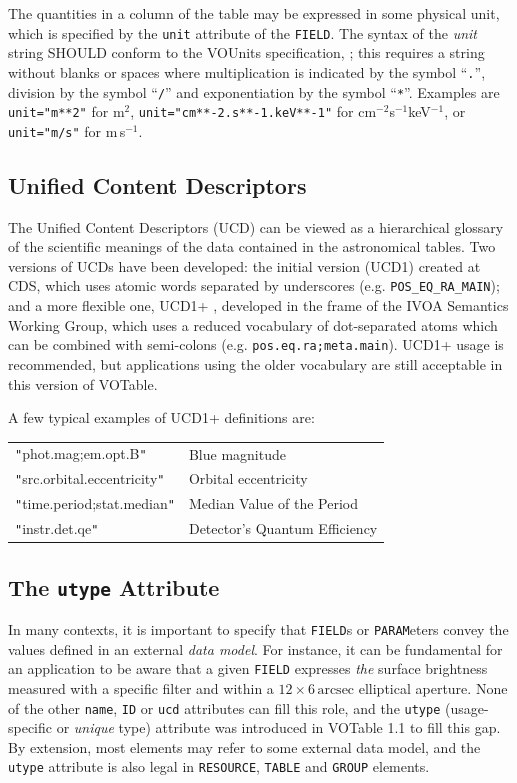 \documentclass[11pt,a4paper]{ivoa}
\let\fg=\color
\def\attr#1{{\tt{\fg{DarkRed}#1}}}
\def\elem#1{{\tt{\fg{DarkRed}#1}}}
\def\attrval#1#2{{\tt{\fg{DarkRed}#1}="{\fg{DarkPurple}#2}"}}
\def\literalvalue#1{{\tt"}{{\fg{DarkPurple}#1}}{\tt"}}
\begin{document}
The quantities in a column of the table may be expressed in
some physical unit,
which is specified by the {\attr{unit}}
attribute of the {\elem{FIELD}}.
The syntax of the {\em unit} string SHOULD conform to
the VOUnits specification, \citet{2023ivoa.spec.1215G};
this requires a string without blanks or spaces
where multiplication is indicated by the symbol ``{\tt.}'',
division by the symbol ``{\tt/}''
and exponentiation by the symbol ``{\tt**}''.
Examples are \attrval{unit}{m**2} for m$^2$,
\attrval{unit}{cm**-2.s**-1.keV**-1} for cm$^{-2}$s$^{-1}$keV$^{-1}$,
or \attrval{unit}{m/s} for m\,s$^{-1}$.

\subsection{Unified Content Descriptors}
\label{sec:ucd}

The Unified Content Descriptors (UCD) can be viewed as a
hierarchical glossary of the scientific meanings of the data
contained in the astronomical tables.
Two versions of UCDs have been developed:
the initial version (UCD1) created at CDS, which uses
atomic words separated by underscores (e.g. {\tt POS\_EQ\_RA\_MAIN});
and a more flexible one, UCD1+ \citep{2023ivoa.spec.0125C},
developed in the frame of the IVOA Semantics Working Group, which uses
a reduced vocabulary of dot-separated atoms which can be
combined with semi-colons (e.g. {\tt pos.eq.ra;meta.main}).
UCD1+ usage is recommended, but applications using the older
vocabulary are still acceptable in this version of VOTable.

\noindent A few typical examples of UCD1+ definitions
 are:

\begin{tabular}{ll}
{\literalvalue{phot.mag;em.opt.B}}        &  Blue magnitude \\
{\literalvalue{src.orbital.eccentricity}} &  Orbital eccentricity \\
{\literalvalue{time.period;stat.median}}  &  Median Value of the Period \\
{\literalvalue{instr.det.qe}}             &  Detector's Quantum Efficiency \\
\end{tabular}


\subsection{The \attr{utype} Attribute}
\label{sec:utype}
In many contexts, it is important to specify that \elem{FIELD}s or
\elem{PARAM}eters convey the values defined in an external {\em data
model}. For instance, it can be fundamental for an application to
be aware that a given \elem{FIELD} expresses \emph{the} surface brightness
measured with a specific filter and within a
$12\times6\,\textrm{arcsec}$ elliptical aperture.
None of the other \attr{name}, \attr{ID}
or \attr{ucd} attributes can fill this role, and
the \attr{utype} (usage-specific or {\em unique} type) attribute was
introduced in VOTable 1.1 to fill this gap.
By extension, most elements may refer to some external data model,
and the \attr{utype} attribute is also legal in \elem{RESOURCE},
\elem{TABLE} and \elem{GROUP} elements.
\end{document}

